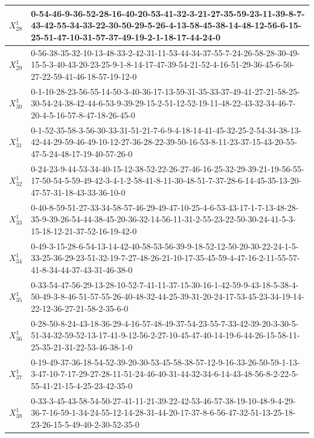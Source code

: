 \begin{landscape}
{\begin{tabularx}{\linewidth}{|c|X|}
        $X_{28}^{1}$ & 0-54-46-9-36-52-28-16-40-20-53-41-32-3-21-27-35-59-23-11-39-8-7-43-42-55-34-33-22-30-50-29-5-26-4-13-58-45-38-14-48-12-56-6-15-25-51-47-10-31-57-37-49-19-2-1-18-17-44-24-0 \\ \hline
        $X_{29}^{1}$ & 0-56-38-35-32-10-13-48-33-2-42-31-11-53-44-34-37-55-7-24-26-58-28-30-49-15-5-3-40-43-20-23-25-9-1-8-14-17-47-39-54-21-52-4-16-51-29-36-45-6-50-27-22-59-41-46-18-57-19-12-0 \\ \hline
        $X_{30}^{1}$ & 0-1-10-28-23-56-55-14-50-3-40-36-17-13-59-31-35-33-37-49-41-27-21-58-25-30-54-24-38-42-44-6-53-9-39-29-15-2-51-12-52-19-11-48-22-43-32-34-46-7-20-4-5-16-57-8-47-18-26-45-0 \\ \hline
        $X_{31}^{1}$ & 0-1-52-35-58-3-56-30-33-31-51-21-7-6-9-4-18-14-41-45-32-25-2-54-34-38-13-42-44-29-59-46-49-10-12-27-36-28-22-39-50-16-53-8-11-23-37-15-43-20-55-47-5-24-48-17-19-40-57-26-0 \\ \hline
        $X_{32}^{1}$ & 0-24-23-9-44-53-34-40-15-12-38-52-22-26-27-46-16-25-32-29-39-21-19-56-55-17-50-54-5-59-49-42-3-4-1-2-58-41-8-11-30-48-51-7-37-28-6-14-45-35-13-20-47-57-31-18-43-33-36-10-0 \\ \hline
        $X_{33}^{1}$ & 0-40-8-59-51-27-33-34-58-57-46-29-49-47-10-25-4-6-53-43-17-1-7-13-48-28-35-9-39-26-54-44-38-45-20-36-32-14-56-11-31-2-55-23-22-50-30-24-41-5-3-15-18-12-21-37-52-16-19-42-0 \\ \hline
        $X_{34}^{1}$ & 0-49-3-15-28-6-54-13-14-42-40-58-53-56-39-9-18-52-12-50-20-30-22-24-1-5-33-25-36-29-23-51-32-19-7-27-48-26-21-10-17-35-45-59-4-47-16-2-11-55-57-41-8-34-44-37-43-31-46-38-0 \\ \hline
        $X_{35}^{1}$ & 0-33-54-47-56-29-13-28-10-52-7-41-11-37-15-30-16-1-42-59-9-43-18-5-38-4-50-49-3-8-46-51-57-55-26-40-48-32-44-25-39-31-20-24-17-53-45-23-34-19-14-22-12-36-27-21-58-2-35-6-0 \\ \hline
        $X_{36}^{1}$ & 0-28-50-8-24-43-18-36-29-4-16-57-48-49-37-54-23-55-7-33-42-39-20-3-30-5-51-34-32-59-52-13-17-41-9-12-56-2-27-10-45-47-40-14-19-6-44-26-15-58-11-25-35-21-31-22-53-46-38-1-0 \\ \hline
        $X_{37}^{1}$ & 0-19-49-37-36-18-54-52-39-20-30-53-45-58-38-57-12-9-16-33-26-50-59-1-13-3-47-10-7-17-29-27-28-11-51-24-46-40-31-44-32-34-6-14-43-48-56-8-2-22-5-55-41-21-15-4-25-23-42-35-0 \\ \hline
        $X_{38}^{1}$ & 0-33-3-45-43-58-54-50-27-41-11-21-39-22-42-53-46-57-38-19-10-48-9-4-29-36-7-16-59-1-34-24-55-12-14-28-31-44-20-17-37-8-6-56-47-32-51-13-25-18-23-26-15-5-49-40-2-30-52-35-0 \\ \hline

\end{tabularx}}
\end{landscape}
